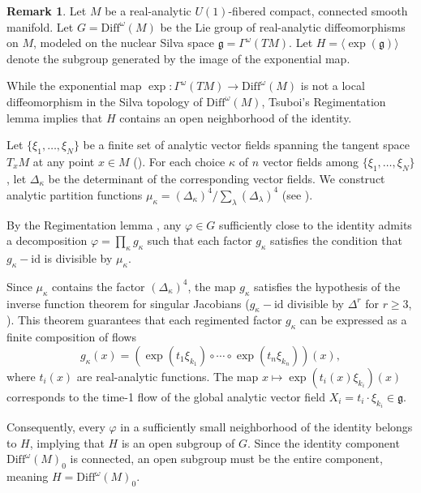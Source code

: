 \documentclass[11pt,reqno]{amsart}
\theoremstyle{definition}
\newtheorem{remark}[theorem]{Remark}
\numberwithin{equation}{section}
\begin{document}
\begin{remark}
Let $M$ be a real-analytic $U(1)$-fibered compact, connected smooth manifold. Let $G = \mathrm{Diff}^\omega(M)$ be the Lie group of real-analytic diffeomorphisms on $M$, modeled on the nuclear Silva space $\mathfrak{g} = \Gamma^\omega(TM)$. Let $H = \langle \exp(\mathfrak{g}) \rangle$ denote the subgroup generated by the image of the exponential map. 

While the exponential map $\exp : \Gamma^\omega(TM) \to \mathrm{Diff}^\omega(M)$ is not a local diffeomorphism in the Silva topology of $\mathrm{Diff}^\omega(M)$, Tsuboi's Regimentation lemma implies that $H$ contains an open neighborhood of the identity.

Let $\{\xi_1, \dots, \xi_N\}$ be a finite set of analytic vector fields spanning the tangent space $T_xM$ at any point $x \in M$ (\cite[Proposition 8.1]{37}). For each choice $\kappa$ of $n$ vector fields among $\{\xi_1, \dots, \xi_N\}$, let $\Delta_\kappa$ be the determinant of the corresponding vector fields. We construct analytic partition functions $\mu_\kappa = (\Delta_\kappa)^4 / \sum_\lambda (\Delta_\lambda)^4$ (see \cite[Section 8]{37}).
    
By the Regimentation lemma \cite[Theorem 7.1]{37}, any $\varphi \in G$ sufficiently close to the identity admits a decomposition $\varphi = \prod_\kappa g_\kappa$ such that each factor $g_\kappa$ satisfies the condition that $g_\kappa - \mathrm{id}$ is divisible by $\mu_\kappa$.
    
Since $\mu_\kappa$ contains the factor $(\Delta_\kappa)^4$, the map $g_\kappa$ satisfies the hypothesis of the inverse function theorem for singular Jacobians ($g_\kappa - \mathrm{id}$ divisible by $\Delta^r$ for $r \ge 3$, \cite[Theorem 6.12]{37}). This theorem guarantees that each regimented factor $g_\kappa$ can be expressed as a finite composition of flows
\[ 
g_\kappa(x) = \left( \exp(t_1 \xi_{k_1}) \circ \cdots \circ \exp(t_n \xi_{k_n}) \right)(x), 
\]
where $t_i(x)$ are real-analytic functions. The map $x \mapsto \exp(t_i(x) \xi_{k_i})(x)$ corresponds to the time-1 flow of the global analytic vector field $X_i = t_i \cdot \xi_{k_i} \in \mathfrak{g}$.

Consequently, every $\varphi$ in a sufficiently small neighborhood of the identity belongs to $H$, implying that $H$ is an open subgroup of $G$. Since the identity component $\mathrm{Diff}^\omega(M)_0$ is connected, an open subgroup must be the entire component, meaning $H = \mathrm{Diff}^\omega(M)_0$.
\end{remark}
\end{document}
